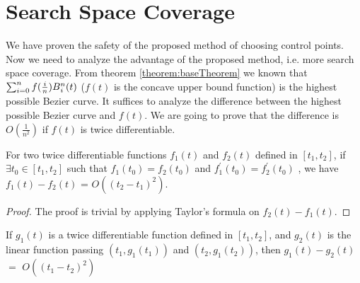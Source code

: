 \section{Search Space Coverage} \label{SearchSpaceCoverage}
We have proven the safety of the proposed method of choosing control points. Now we need to analyze the advantage of the proposed method, i.e. more search space coverage. From theorem \ref{theorem:baseTheorem} we known that $\sum_{i=0}^{n}f(\frac{i}{n})B\textsupsub{$n$}{$i$}(t)$ ($f(t)$ is the concave upper bound function) is the highest possible Bezier curve. It suffices to analyze the difference between the highest possible Bezier curve and $f(t)$. We are going to prove that the difference is $O(\frac{1}{n^{2}})$ if $f(t)$ is twice differentiable.

\begin{lemma}
For two twice differentiable functions $f_{1}(t)$ and $f_{2}(t)$ defined in $\left[t_{1}, t_{2}\right]$, if $\exists t_{0} \in \left[t_{1}, t_{2}\right]$ such that $f_{1}(t_{0}) = f_{2}(t_{0})$ and $f^{\prime}_{1}(t_{0}) = f^{\prime}_{2}(t_{0})$ , we have $f_{1}(t) - f_{2}(t)$ = $O((t_{2}-t_{1})^2)$.
\label{lemma:simpleTangentO2Diff}
\end{lemma}

\begin{proof}
The proof is trivial by applying Taylor's formula on $f_{2}(t) - f_{1}(t)$.
\end{proof}

\begin{lemma}
If $g_{1}(t)$ is a twice differentiable function defined in $\left[t_{1}, t_{2}\right]$, and $g_{2}(t)$ is the linear function passing $(t_{1}, g_{1}(t_{1}))$ and $(t_{2}, g_{1}(t_{2}))$, then $g_{1}(t) - g_{2}(t)$ $=$ $O((t_{1} - t_{2})^{2})$  
\label{lemma:2ndOrderDiff}
\end{lemma}

